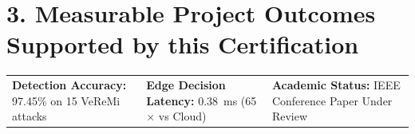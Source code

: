 \documentclass[10pt,a4paper]{article}
\begin{document}
\section*{3. Measurable Project Outcomes Supported by this Certification}
\noindent
\begin{tabularx}{\textwidth}{@{}X X X@{}}
    \textbf{Detection Accuracy:} 97.45\% on 15 VeReMi attacks & 
    \textbf{Edge Decision Latency:} 0.38~ms (65$\times$ vs Cloud) & 
    \textbf{Academic Status:} IEEE Conference Paper Under Review \\
\end{tabularx}
\end{document}
